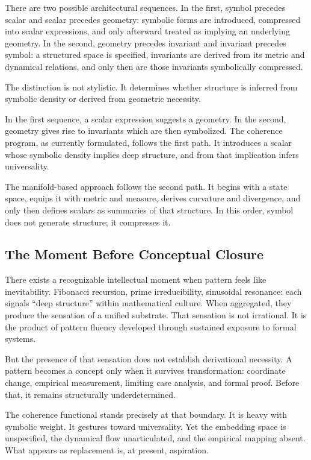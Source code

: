 \documentclass[12pt]{article}
\begin{document}
There are two possible architectural sequences. In the first, symbol precedes scalar and scalar precedes geometry: symbolic forms are introduced, compressed into scalar expressions, and only afterward treated as implying an underlying geometry. In the second, geometry precedes invariant and invariant precedes symbol: a structured space is specified, invariants are derived from its metric and dynamical relations, and only then are those invariants symbolically compressed.

The distinction is not stylistic. It determines whether structure is inferred from symbolic density or derived from geometric necessity.

In the first sequence, a scalar expression suggests a geometry. In the second, geometry gives rise to invariants which are then symbolized. The coherence program, as currently formulated, follows the first path. It introduces a scalar whose symbolic density implies deep structure, and from that implication infers universality.

The manifold-based approach follows the second path. It begins with a state space, equips it with metric and measure, derives curvature and divergence, and only then defines scalars as summaries of that structure. In this order, symbol does not generate structure; it compresses it.

\subsection{The Moment Before Conceptual Closure}

There exists a recognizable intellectual moment when pattern feels like inevitability. Fibonacci recursion, prime irreducibility, sinusoidal resonance: each signals ``deep structure'' within mathematical culture. When aggregated, they produce the sensation of a unified substrate. That sensation is not irrational. It is the product of pattern fluency developed through sustained exposure to formal systems.

But the presence of that sensation does not establish derivational necessity. A pattern becomes a concept only when it survives transformation: coordinate change, empirical measurement, limiting case analysis, and formal proof. Before that, it remains structurally underdetermined.

The coherence functional stands precisely at that boundary. It is heavy with symbolic weight. It gestures toward universality. Yet the embedding space is unspecified, the dynamical flow unarticulated, and the empirical mapping absent. What appears as replacement is, at present, aspiration.
\end{document}
